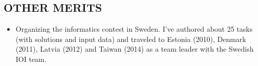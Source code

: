 \documentclass[11pt]{res} %
\begin{document}
\begin{resume}
\section{OTHER MERITS}

   \begin{itemize} %
   \item Organizing the informatics contest in Sweden.  I've authored about
     25 tasks (with solutions and input data) and traveled to Estonia (2010),
     Denmark (2011), Latvia (2012) and Taiwan (2014) as a team leader with the Swedish IOI
     team.
 \end{itemize}

\end{resume}
\end{document}
